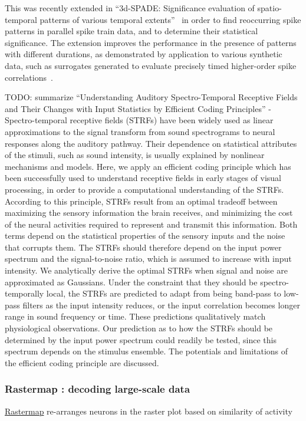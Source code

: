 \documentclass[brainsci, %
               review,submit,pdftex,moreauthors%
               ]{Definitions/mdpi}
\begin{document}
This was recently extended in ``3d-SPADE: Significance evaluation of spatio-temporal patterns of various temporal extents''~\citep{stella_3d-spade_2019} in order to find reoccurring spike patterns in parallel spike train data, and to determine their statistical significance. The extension improves the performance in the presence of patterns with different durations, as demonstrated by application to various synthetic data, such as surrogates generated to evaluate precisely timed higher-order spike correlations~\citep{stella_comparing_2022}.

TODO: summarize ``Understanding Auditory Spectro-Temporal Receptive Fields and Their Changes with Input Statistics by Efficient Coding Principles'' - Spectro-temporal receptive fields (STRFs) have been widely used as linear approximations to the signal transform from sound spectrograms to neural responses along the auditory pathway. Their dependence on statistical attributes of the stimuli, such as sound intensity, is usually explained by nonlinear mechanisms and models. Here, we apply an efficient coding principle which has been successfully used to understand receptive fields in early stages of visual processing, in order to provide a computational understanding of the STRFs. According to this principle, STRFs result from an optimal tradeoff between maximizing the sensory information the brain receives, and minimizing the cost of the neural activities required to represent and transmit this information. Both terms depend on the statistical properties of the sensory inputs and the noise that corrupts them. The STRFs should therefore depend on the input power spectrum and the signal-to-noise ratio, which is assumed to increase with input intensity. We analytically derive the optimal STRFs when signal and noise are approximated as Gaussians. Under the constraint that they should be spectro-temporally local, the STRFs are predicted to adapt from being band-pass to low-pass filters as the input intensity reduces, or the input correlation becomes longer range in sound frequency or time. These predictions qualitatively match physiological observations. Our prediction as to how the STRFs should be determined by the input power spectrum could readily be tested, since this spectrum depends on the stimulus ensemble. The potentials and limitations of the efficient coding principle are discussed.
~\citep{zhao_understanding_2011}

\subsubsection{Rastermap : decoding large-scale data}\label{rastermap-decoding-large-scale-data}
\href{https://nbviewer.org/github/MouseLand/rastermap/blob/master/tutorial/tutorial.ipynb}{Rastermap} re-arranges neurons in the raster plot based on similarity of activity
\end{document}
